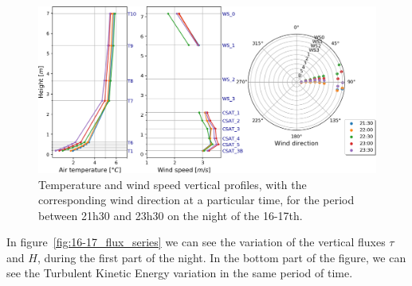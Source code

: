 \begin{figure}[!ht]
    \centering
    \includegraphics[width=1\textwidth]{fig/chapter_4/16-17/21-23_profiles.png}
    \caption{Temperature and wind speed vertical profiles, with the corresponding wind direction at a particular time, for the period between 21h30 and 23h30 on the night of the 16-17th.}
    \label{fig:16-17_21-23_profiles.png}
\end{figure}

In figure~\ref{fig:16-17_flux_series} we can see the variation of the vertical fluxes $\tau$ and $H$, during the first part of the night. In the bottom part of the figure, we can see the Turbulent Kinetic Energy variation in the same period of time.

